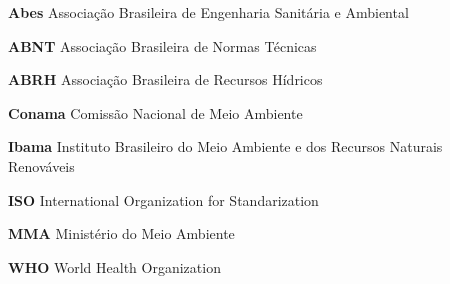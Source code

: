 
\begin{siglas}

\item[\textbf{Abes}] Associação Brasileira de Engenharia Sanitária e Ambiental
\item[\textbf{ABNT}] Associação Brasileira de Normas Técnicas
\item[\textbf{ABRH}] Associação Brasileira de Recursos Hídricos
\item[\textbf{Conama}] Comissão Nacional de Meio Ambiente
\item[\textbf{Ibama}] Instituto Brasileiro do Meio Ambiente e dos Recursos Naturais Renováveis
\item[\textbf{ISO}] International Organization for Standarization
\item[\textbf{MMA}] Ministério do Meio Ambiente
\item[\textbf{WHO}] World Health Organization

\end{siglas}

